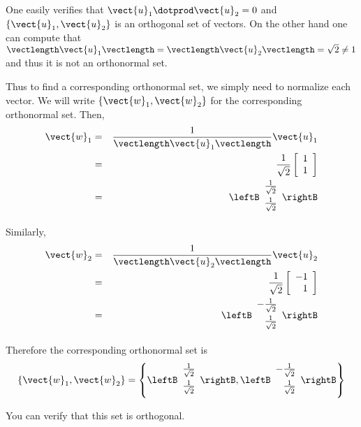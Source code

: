 \begin{solution}
One easily verifies that $\vect{u}_1 \dotprod \vect{u}_2 = 0$ and
$\left\{ \vect{u}_1, \vect{u}_2 \right\}$ is an orthogonal set of
vectors. On the other hand one can compute that $\vectlength \vect{u}_1 \vectlength= \vectlength \vect{u}_2 \vectlength =
\sqrt{2} \neq 1$ and thus it is not an orthonormal set.

Thus to find a corresponding orthonormal set, we simply need to
normalize each vector. We will write $\{ \vect{w}_1, \vect{w}_2 \}$
for the corresponding orthonormal set. Then,
\begin{eqnarray*}
\vect{w}_1 &=& \frac{1}{\vectlength \vect{u}_1 \vectlength} \vect{u}_1\\
&=& \frac{1}{\sqrt{2}} \left[
\begin{array}{c}
1 \\
1 
\end{array}
\right] \\
&=&
\leftB
\begin{array}{c}
\vspace{0.05in} \frac{1}{\sqrt{2}}\\
\vspace{0.05in}\frac{1}{\sqrt{2}} 
\end{array}
\rightB
\end{eqnarray*}

Similarly, 
\begin{eqnarray*}
\vect{w}_2 &=& \frac{1}{\vectlength \vect{u}_2 \vectlength} \vect{u}_2\\
&=& \frac{1}{\sqrt{2}} \left[
\begin{array}{r}
-1 \\
1 
\end{array}
\right] \\
&=&
\leftB
\begin{array}{r}
\vspace{0.05in} -\frac{1}{\sqrt{2}}\\
\vspace{0.05in}\frac{1}{\sqrt{2}} 
\end{array}
\rightB
\end{eqnarray*}

Therefore the corresponding orthonormal set is 
\[
\left\{ \vect{w}_1, \vect{w}_2 \right\} = 
\left\{
\leftB
\begin{array}{c}
\vspace{0.05in} \frac{1}{\sqrt{2}}\\
\vspace{0.05in}\frac{1}{\sqrt{2}} 
\end{array}
\rightB,
\leftB
\begin{array}{r}
\vspace{0.05in} -\frac{1}{\sqrt{2}}\\
\vspace{0.05in}\frac{1}{\sqrt{2}} 
\end{array}
\rightB
\right\} 
\]

You can verify that this set is orthogonal.
\end{solution}

